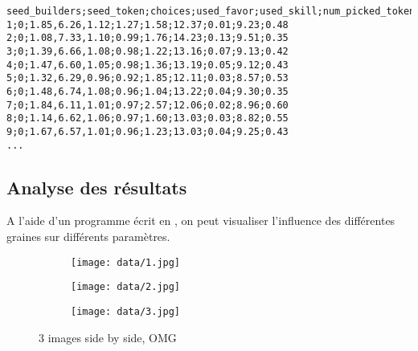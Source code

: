 \begin{lstlisting}[frame=single, caption={Affichage des résultats}]
seed_builders;seed_token;choices;used_favor;used_skill;num_picked_tokens;forced_skip;nb_turns;result
1;0;1.85,6.26,1.12;1.27;1.58;12.37;0.01;9.23;0.48
2;0;1.08,7.33,1.10;0.99;1.76;14.23;0.13;9.51;0.35
3;0;1.39,6.66,1.08;0.98;1.22;13.16;0.07;9.13;0.42
4;0;1.47,6.60,1.05;0.98;1.36;13.19;0.05;9.12;0.43
5;0;1.32,6.29,0.96;0.92;1.85;12.11;0.03;8.57;0.53
6;0;1.48,6.74,1.08;0.96;1.04;13.22;0.04;9.30;0.35
7;0;1.84,6.11,1.01;0.97;2.57;12.06;0.02;8.96;0.60
8;0;1.14,6.62,1.06;0.97;1.60;13.03;0.03;8.82;0.55
9;0;1.67,6.57,1.01;0.96;1.23;13.03;0.04;9.25;0.43
...
\end{lstlisting}

\subsection{Analyse des résultats}

A l'aide d'un programme écrit en , on peut visualiser l'influence des différentes graines sur différents paramètres.


\begin{figure}[!h]
    \centering
    \begin{subfigure}[b]{0.3\textwidth}
        \texttt{[image: data/1.jpg]}
    \end{subfigure}
    \begin{subfigure}[b]{0.3\textwidth}
        \texttt{[image: data/2.jpg]}
    \end{subfigure}
    \begin{subfigure}[b]{0.3\textwidth}
        \texttt{[image: data/3.jpg]}
    \end{subfigure}
    \caption{3 images side by side, OMG}
\end{figure}

